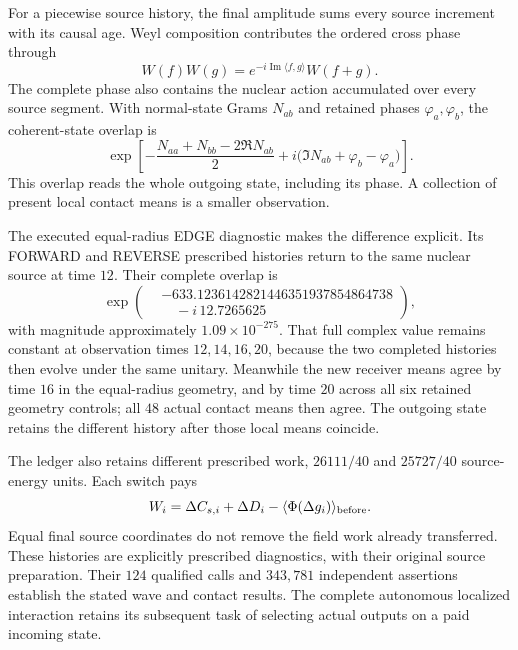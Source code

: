 For a piecewise source history, the final amplitude sums every source increment with its causal age. Weyl composition contributes the ordered cross phase through
\begin{equation}
 W(f)W(g)=e^{-i\operatorname{Im}\langle f,g\rangle}W(f+g).
\end{equation}
The complete phase also contains the nuclear action accumulated over every source segment. With normal-state Grams $N_{ab}$ and retained phases $\varphi_a,\varphi_b$, the coherent-state overlap is
\begin{equation}
 \exp\!\left[-\frac{N_{aa}+N_{bb}-2\Re N_{ab}}2
 +i\bigl(\Im N_{ab}+\varphi_b-\varphi_a\bigr)\right].
\end{equation}
This overlap reads the whole outgoing state, including its phase. A collection of present local contact means is a smaller observation.

The executed equal-radius EDGE diagnostic makes the difference explicit. Its FORWARD and REVERSE prescribed histories return to the same nuclear source at time $12$. Their complete overlap is
\begin{equation}
 \exp\!\left(\begin{aligned}
 &-633.1236142821446351937854864738\\
 &\quad-i\,12.7265625
 \end{aligned}\right),
\end{equation}
with magnitude approximately $1.09\times10^{-275}$. That full complex value remains constant at observation times $12,14,16,20$, because the two completed histories then evolve under the same unitary. Meanwhile the new receiver means agree by time $16$ in the equal-radius geometry, and by time $20$ across all six retained geometry controls; all $48$ actual contact means then agree. The outgoing state retains the different history after those local means coincide.

The ledger also retains different prescribed work, $26111/40$ and $25727/40$ source-energy units. Each switch pays
\begin{equation}
 W_i=\Delta C_{s,i}+\Delta D_i
 -\langle\Phi(\Delta g_i)\rangle_{\rm before}.
\end{equation}
Equal final source coordinates do not remove the field work already transferred. These histories are explicitly prescribed diagnostics, with their original source preparation. Their $124$ qualified calls and $343{,}781$ independent assertions establish the stated wave and contact results. The complete autonomous localized interaction retains its subsequent task of selecting actual outputs on a paid incoming state.


